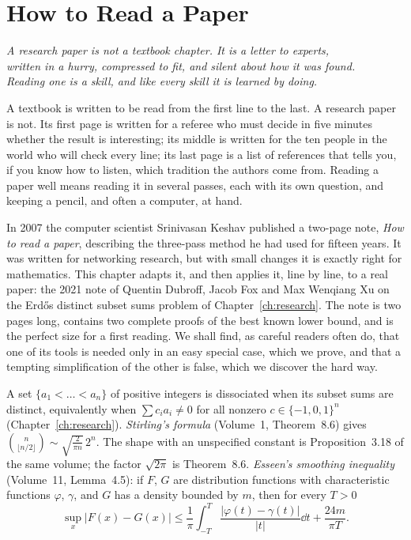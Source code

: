 \chapter{How to Read a Paper}
\label{ch:reading}

\begin{center}\itshape
A research paper is not a textbook chapter. It is a letter to experts,\\
written in a hurry, compressed to fit, and silent about how it was found.\\
Reading one is a skill, and like every skill it is learned by doing.
\end{center}

A textbook is written to be read from the first line to the last. A research paper is not. Its first page is written for a referee
who must decide in five minutes whether the result is interesting; its middle is written for the ten people in the world who will check
every line; its last page is a list of references that tells you, if you know how to listen, which tradition the authors come from.
Reading a paper well means reading it in several passes, each with its own question, and keeping a pencil, and often a computer, at hand.

In 2007 the computer scientist Srinivasan Keshav published a two-page note, \emph{How to read a paper}, describing the three-pass method he
had used for fifteen years. It was written for networking research, but with small changes it is exactly right for mathematics. This chapter
adapts it, and then applies it, line by line, to a real paper: the 2021 note of Quentin Dubroff, Jacob Fox and Max Wenqiang Xu on the Erd\H os
distinct subset sums problem of Chapter~\ref{ch:research}. The note is two pages long, contains two complete proofs of the best known lower bound,
and is the perfect size for a first reading. We shall find, as careful readers often do, that one of its tools is needed only in an easy
special case, which we prove, and that a tempting simplification of the other is false, which we discover the hard way.

\begin{reminder}
A set $\{a_1<\dots<a_n\}$ of positive integers is dissociated when its subset sums are distinct, equivalently when $\sum c_ia_i\ne0$ for all nonzero
$c\in\{-1,0,1\}^n$ (Chapter~\ref{ch:research}). \emph{Stirling's formula} (Volume~1, Theorem~8.6) gives $\binom n{\lfloor n/2\rfloor}\sim\sqrt{\frac2{\pi n}}\,2^n$. The shape with an unspecified constant is Proposition~3.18 of the same volume; the factor $\sqrt{2\pi}$ is Theorem~8.6. \emph{Esseen's smoothing inequality}
(Volume~11, Lemma~4.5): if $F$, $G$ are distribution functions with characteristic functions $\varphi$, $\gamma$, and $G$ has a density bounded by $m$, then for
every $T>0$
\[
\sup_x|F(x)-G(x)|\le\frac1\pi\int_{-T}^T\frac{|\varphi(t)-\gamma(t)|}{|t|}\dd t+\frac{24m}{\pi T}.
\]
\end{reminder}

